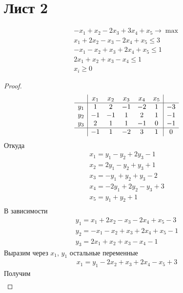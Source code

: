 \section{Лист 2}

\begin{prob}
\begin{gather*}
	-x_{1} + x_{2} - 2x_{3} + 3x_{4} + x_{5} \to \max \\
	x_{1} + 2x_{2} - x_{3} - 2x_{4} + x_{5} \leqslant 3 \\
	-x_{1} - x_{2} + x_{3} + 2x_{4} + x_{5} \leqslant 1 \\
	2x_{1} + x_{2} + x_{3} - x_{4} \leqslant 1 \\
	x_{i} \geqslant 0
\end{gather*}
\end{prob}
\begin{proof}
	\begin{gather*}
	\begin{array}{c|ccccc|c} 
		& x_{1} & x_{2} & x_{3} & x_{4} & x_{5} & \\
		\hline 
		y_{1} & 1 & 2 & -1 & -2 & 1 & -3\\
		y_{2} & -1 & -1 & 1 & 2 & 1 & -1 \\
		y_{3} & 2 & 1 & 1 & -1 & 0 & -1\\
		\hline 
		& -1 & 1 & -2 & 3 & 1 & 0
	\end{array}
	\end{gather*}
	Откуда
	\begin{gather*}
		x_{1} = y_{1} - y_{2} + 2y_{3} - 1\\
		x_{2} = 2y_{1} - y_{2} + y_{3} + 1\\
		x_{3} = -y_{1} + y_{2} + y_{3} - 2\\
		x_{4} = -2y_{1} + 2y_{2} - y_{3} + 3\\
		x_{5} = y_{1} + y_{2} + 1\\
	\end{gather*}
	В зависимости
	\begin{gather*}
		y_{1} = x_{1} + 2x_{2} - x_{3} - 2x_{4} + x_{5} - 3\\
		y_{2} = -x_{1} - x_{2} + x_{3} + 2x_{4} + x_{5} - 1\\
		y_{3} = 2x_{1} + x_{2} + x_{3} - x_{4} - 1
	\end{gather*}
	Выразим через $x_{1}$, $y_{1}$ остальные переменные
	\begin{gather*}
		x_{1} = y_{1} - 2x_{2} + x_{3} + 2x_{4} - x_{5} + 3
	\end{gather*}
	Получим
	\begin{gather*}

\end{gather*}
\end{proof}
